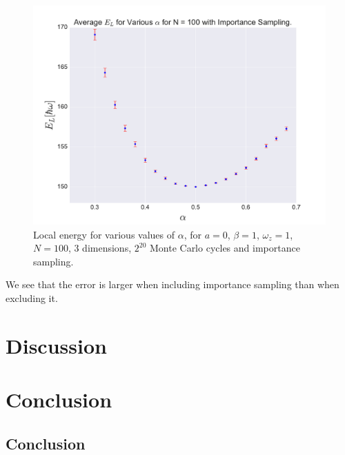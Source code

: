 \documentclass[a4paper, 10pt]{article}
\begin{document}
		\begin{figure}[ht!]
			\centering
			\includegraphics[scale=0.8]{../Results/N100ax20/EvAlphaN100IS.pdf}
			\caption{Local energy for various values of $\alpha$, for $a=0$, $\beta=1$, $\omega_z=1$, $N=100$, 3 dimensions, $2^{20}$ Monte Carlo cycles and importance sampling.}\label{fig:Average_EL_N=100_importance}
		\end{figure}
	We see that the error is larger when including importance sampling than when excluding it. 
	\section{Discussion}
	
	\section{Conclusion}
	
	\subsection{Conclusion}
	
\end{document}
